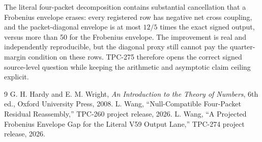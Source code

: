 \documentclass[11pt]{article}
\begin{document}
The literal four-packet decomposition contains substantial cancellation that a
Frobenius envelope erases: every registered row has negative net cross coupling,
and the packet-diagonal envelope is at most \(12/5\) times the exact signed
output, versus more than 50 for the Frobenius envelope.  The improvement is
real and independently reproducible, but the diagonal proxy still cannot pay
the quarter-margin condition on these rows.  TPC-275 therefore opens the
correct signed source-level question while keeping the arithmetic and
asymptotic claim ceiling explicit.

\begin{thebibliography}{9}
G. H. Hardy and E. M. Wright, \emph{An Introduction to the Theory of Numbers},
6th ed., Oxford University Press, 2008.
L. Wang, ``Null-Compatible Four-Packet Residual Reassembly,'' TPC-260 project
release, 2026.
L. Wang, ``A Projected Frobenius Envelope Gap for the Literal V59 Output
Lane,'' TPC-274 project release, 2026.
\end{thebibliography}
\end{document}
